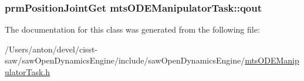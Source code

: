 \subsubsection[{qout}]{\setlength{\rightskip}{0pt plus 5cm}prm\+Position\+Joint\+Get mts\+O\+D\+E\+Manipulator\+Task\+::qout}\label{classmts_o_d_e_manipulator_task_a162ca16e37ce8838ff2214b8b33f4b84}


The documentation for this class was generated from the following file\+:\begin{DoxyCompactItemize}
\item 
/\+Users/anton/devel/cisst-\/saw/saw\+Open\+Dynamics\+Engine/include/saw\+Open\+Dynamics\+Engine/\hyperlink{mts_o_d_e_manipulator_task_8h}{mts\+O\+D\+E\+Manipulator\+Task.\+h}\end{DoxyCompactItemize}
